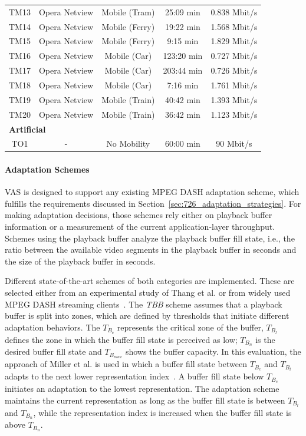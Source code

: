 \begin{table}[!htb]
\begin{tabular}{c|cccc}
	TM13 & Opera Netview & Mobile (Tram) & 25:09 min & 0.838 Mbit/s \\
	TM14 & Opera Netview & Mobile (Ferry) & 19:22 min & 1.568 Mbit/s \\
	TM15 & Opera Netview & Mobile (Ferry) & 9:15 min & 1.829 Mbit/s \\
	TM16 & Opera Netview & Mobile (Car) & 123:20 min & 0.727 Mbit/s \\
	TM17 & Opera Netview & Mobile (Car) & 203:44 min & 0.726 Mbit/s \\
	TM18 & Opera Netview & Mobile (Car) & 7:16 min & 1.761 Mbit/s \\
	TM19 & Opera Netview & Mobile (Train) & 40:42 min & 1.393 Mbit/s \\
	TM20 & Opera Netview & Mobile (Train) & 36:42 min & 1.123 Mbit/s \\
	\hline
	\multicolumn{5}{l}{\textbf{Artificial}}\\
	\hline
	TO1 & - & No Mobility & 60:00 min & 90 Mbit/s \\
	\bottomrule[2.0pt]
	\end{tabular} 
	\label{tab:730_traces}
\end{table}
\paragraph{Adaptation Schemes}
\label{sec:730_BufferApproaches}
\ac{VAS} is designed to support any existing \ac{MPEG} \ac{DASH} adaptation scheme, which fulfills the requirements discussed in Section~\ref{sec:726_adaptation_strategies}.
For making adaptation decisions, those schemes rely either on  playback buffer information or a measurement of  the current application-layer throughput.
Schemes using the playback buffer analyze the playback buffer fill state, i.e., the ratio between the available video segments in the playback buffer in seconds and the size of the playback buffer in seconds.

Different state-of-the-art schemes of both categories are implemented. These are selected either from an experimental study of Thang et al. or from widely used \ac{MPEG} \ac{DASH} streaming clients~\cite{Thang2014}.
The \emph{\ac{TBB}} scheme assumes that a playback buffer is split into zones, which are defined by thresholds that initiate different adaptation behaviors.
The $T_{B_{c}}$ represents the critical zone of the buffer, $T_{B_{l}}$ defines the zone in which the buffer fill state is perceived as low; $T_{B_{n}}$ is the desired buffer fill state and $T_{B_{max}}$ shows the buffer capacity.
In this evaluation, the approach of Miller et al. is used in which a  buffer fill state between $T_{B_{c}}$ and $T_{B_{l}}$ adapts to the next lower representation index~\cite{Miller2012}.
A buffer fill state below $T_{B_{c}}$ initiates an adaptation to the lowest representation.
The adaptation scheme maintains the current representation as long as the buffer fill state is between $T_{B_{l}}$ and $T_{B_{n}}$, while the representation index is increased when the buffer fill state is above $T_{B_{n}}$.

